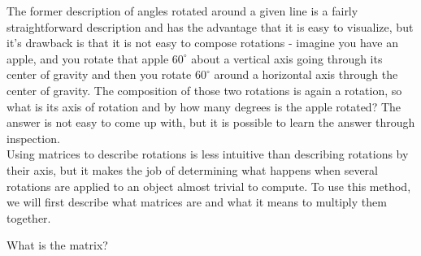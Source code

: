 The former description of angles rotated around a given line is a fairly straightforward description and has the advantage that it is easy to visualize, but it's drawback is that it is not easy to compose rotations - imagine you have an apple, and you rotate that apple $60^\circ$ about a vertical axis going through its center of gravity and then you rotate $60^\circ$ around a horizontal axis through the center of gravity. The composition of those two rotations is again a rotation, so what is its axis of rotation and by how many degrees is the apple rotated? The answer is not easy to come up with, but it is possible to learn the answer through inspection. \\

Using matrices to describe rotations is less intuitive than describing rotations by their axis, but it makes the job of determining what happens when several rotations are applied to an object almost trivial to compute. To use this method, we will first describe what matrices are and what it means to multiply them together. \\

 \vspace{0.2cm}


What is the matrix? \\

